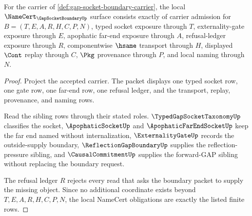 \begin{theorem}
\label{thm:gap-socket-boundary-namecert-obligations}
For the carrier of \autoref{def:gap-socket-boundary-carrier}, the local $\NameCert_{\GapSocketBoundaryUp}$ surface consists exactly of carrier admission for $B=(T,E,A,R,H,C,P,N)$, typed socket exposure through $T$, externality-gate exposure through $E$, apophatic far-end exposure through $A$, refusal-ledger exposure through $R$, componentwise $\hsame$ transport through $H$, displayed $\Cont$ replay through $C$, $\Pkg$ provenance through $P$, and local naming through $N$.
\end{theorem}
\begin{proof}
Project the accepted carrier. The packet displays one typed socket row, one gate row, one far-end row, one refusal ledger, and the transport, replay, provenance, and naming rows.

Read the sibling rows through their stated roles. $\TypedGapSocketTaxonomyUp$ classifies the socket, $\ApophaticSocketUp$ and $\ApophaticFarEndSocketUp$ keep the far end named without internalization, $\ExternalityGateUp$ records the outside-supply boundary, $\ReflectionGapBoundaryUp$ supplies the reflection-pressure sibling, and $\CausalCommitmentUp$ supplies the forward-GAP sibling without replacing the boundary request.

The refusal ledger $R$ rejects every read that asks the boundary packet to supply the missing object. Since no additional coordinate exists beyond $T,E,A,R,H,C,P,N$, the local NameCert obligations are exactly the listed finite rows.
\end{proof}

